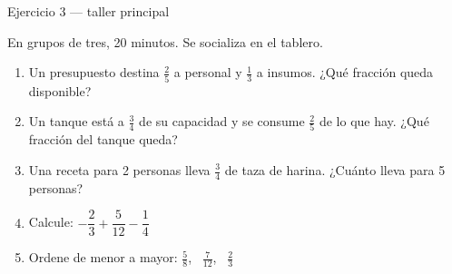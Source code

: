 \documentclass[aspectratio=169,10pt]{beamer}
\begin{document}
\begin{frame}{Ejercicio 3 — taller principal}
  \begin{alertblock}{En grupos de tres, 20 minutos. Se socializa en el tablero.}
    \scriptsize
    \begin{enumerate}\setlength{\itemsep}{0.02cm}
      \item Un presupuesto destina $\tfrac{2}{5}$ a personal y $\tfrac{1}{3}$ a
            insumos. ¿Qué fracción queda disponible?
      \item Un tanque está a $\tfrac{3}{4}$ de su capacidad y se consume
            $\tfrac{2}{5}$ de lo que hay. ¿Qué fracción del tanque queda?
      \item Una receta para 2 personas lleva $\tfrac{3}{4}$ de taza de
            harina. ¿Cuánto lleva para 5 personas?
      \item Calcule: $-\dfrac{2}{3}+\dfrac{5}{12}-\dfrac{1}{4}$
      \item Ordene de menor a mayor: $\tfrac{5}{8}$, \ $\tfrac{7}{12}$, \
            $\tfrac{2}{3}$
    \end{enumerate}
  \end{alertblock}
\end{frame}
\end{document}
